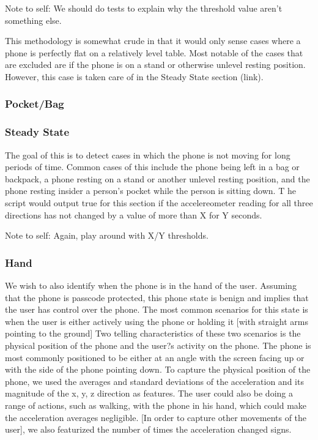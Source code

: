 \documentclass{article}
\begin{document}
Note to self: We should do tests to explain why the threshold value aren't something else. 

\indent This methodology is somewhat crude in that it would only sense cases where a phone is perfectly flat on a relatively level table. 
Most notable of the cases that are excluded are if the phone is on a stand or otherwise unlevel resting position. 
However, this case is taken care of in the Steady State section (link).
\subsubsection{Pocket/Bag}

\subsubsection{Steady State}
\indent The goal of this is to detect cases in which the phone is not moving for long periods of time. 
Common cases of this include the phone being left in a bag or backpack, a phone resting on a stand or another unlevel resting position, and the phone resting insider a person's pocket while the person is sitting down. T
he script would output true for this section if the accelereometer reading for all three directions has not changed by a value of more than X for Y seconds.

Note to self: Again, play around with X/Y thresholds. 

\subsubsection{Hand}
We wish to also identify when the phone is in the hand of the user.
 Assuming that the phone is passcode protected, this phone state is benign and implies that the user has control over the phone. 
The most common scenarios for this state is when the user is either actively using the phone or holding it [with straight arms pointing to the ground]
 Two telling characteristics of these two scenarios is the physical position of the phone and the user?s activity on the phone. 
The phone is most commonly positioned to be either at an angle with the screen facing up or with the side of the phone pointing down. 
To capture the physical position of the phone, we used the averages and standard deviations of the  acceleration and its magnitude of the x, y, z direction as features. 
The user could also be doing a range of actions, such as walking, with the phone in his hand, which could make the acceleration averages negligible. 
[In order to capture other movements of the user], we also featurized the number of times the acceleration changed signs. 
\end{document}
